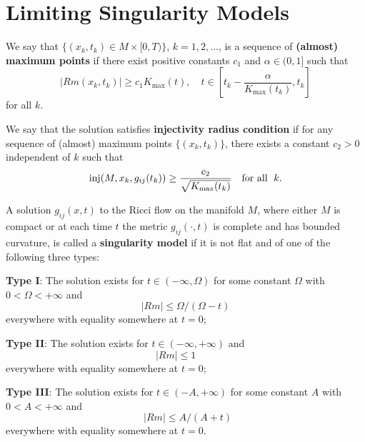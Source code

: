 \section{Limiting Singularity Models}
\begin{definition}
  \label{def:cz-almost-maximum-curvature-points}
We say that $\{(x_k,t_k) \in M\times [0,T) \}$, $k=1, 2, \ldots$,
is a sequence of {\bf (almost) maximum points} if there exist positive constants $c_1$ and
$\alpha \in (0,1]$ such that
$$
|Rm(x_k,t_k)|\geq c_1 K_{\max}(t), \quad t\in
[t_k-\frac{\alpha}{K_{\max}(t_k)},t_k]
$$
for all $k$.
\end{definition}
\begin{definition}
  \label{def:cz-injectivity-radius-condition-at-almost-maximum-points}
We say that the solution satisfies {\bf injectivity radius
condition} if for any sequence
of (almost) maximum points $\{(x_k,t_k)\}$, there exists a
constant $c_2>0$ independent of $k$ such that
$$
\operatorname{inj}(M,x_k,g_{ij}(t_k))\geq \frac{c_2}{\sqrt{K_{\max}(t_k)}} \quad
\text{for all }\;   k.
$$
\end{definition}
\begin{definition}
  \label{def:cz-singularity-types-for-maximal-ricci-flows}
A solution $g_{ij}(x,t)$ to the Ricci flow on the manifold $M$,
where either $M$ is compact or at each time $t$ the metric
$g_{ij}(\cdot,t)$ is complete and has bounded curvature, is called
a {\bf singularity model} if it is not
flat and of one of the following three types:

\vskip 0.1cm\noindent \textbf{Type I}: The solution
exists for $t\in(-\infty,\Omega)$ for some constant $\Omega$ with
$0<\Omega<+\infty$ and
$$
|Rm|\leq\Omega/(\Omega-t)
$$
everywhere with equality somewhere at $t=0$;

\vskip 0.1cm\noindent \textbf{Type II}: The
solution exists for $t\in(-\infty,+\infty)$  and
$$
|Rm|\leq 1 \ \ \ \ \ \ \ \ \
$$
everywhere with equality somewhere at $t=0$;

\vskip 0.1cm\noindent \textbf{Type III}: The
solution exists for $t\in(-A,+\infty)$ for some constant $A$ with
$0<A<+\infty$ and
$$
\ \ |Rm|\leq A/(A+t)
$$
everywhere with equality somewhere at $t=0$.
\end{definition}
